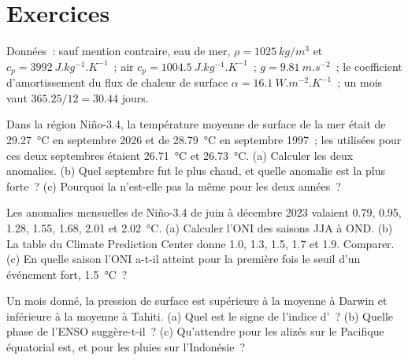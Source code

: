 \section*{Exercices}\label{sec:b2:climate-variability:exercises}

Données~: sauf mention contraire, eau de mer, $\rho = \qty{1025}{kg/m^3}$ et $c_p =
\qty{3992}{J.kg^{-1}.K^{-1}}$~; air $c_p = \qty{1004.5}{J.kg^{-1}.K^{-1}}$~; $g =
\qty{9.81}{m.s^{-2}}$~; le coefficient d'amortissement du flux de chaleur de surface $\alpha =
\qty{16.1}{W.m^{-2}.K^{-1}}$~; un mois vaut $365.25/12 = 30.44$ jours.

\begin{exercise}[$\star$]\label{exo:b2:climate-variability:1}
Dans la région Niño-3.4, la température moyenne de surface de la mer était de \qty{29.27}{\celsius} en septembre
2026 et de \qty{28.79}{\celsius} en septembre 1997~; les  utilisées pour ces deux septembres étaient
\qty{26.71}{\celsius} et \qty{26.73}{\celsius}. (a) Calculer les deux anomalies. (b) Quel septembre fut le plus chaud,
et quelle anomalie est la plus forte~? (c) Pourquoi la  n'est-elle pas la même
pour les deux années~?
\end{exercise}

\begin{exercise}[$\star$]\label{exo:b2:climate-variability:2}
Les anomalies mensuelles de Niño-3.4 de juin à décembre 2023 valaient 0.79, 0.95, 1.28, 1.55, 1.68, 2.01
et \qty{2.02}{\celsius}. (a) Calculer l'ONI des saisons JJA à OND. (b) La table du Climate Prediction Center
donne 1.0, 1.3, 1.5, 1.7 et 1.9. Comparer. (c) En quelle saison l'ONI a-t-il atteint pour la première fois
le seuil d'un événement fort, \qty{1.5}{\celsius}~?
\end{exercise}

\begin{exercise}[$\star$]\label{exo:b2:climate-variability:3}
Un mois donné, la pression de surface est supérieure à la moyenne à Darwin et inférieure à la moyenne à Tahiti.
(a) Quel est le signe de l'indice d'~? (b) Quelle phase de l'ENSO suggère-t-il~?
(c) Qu'attendre pour les alizés sur le Pacifique équatorial est,
et pour les pluies sur l'Indonésie~?
\end{exercise}

